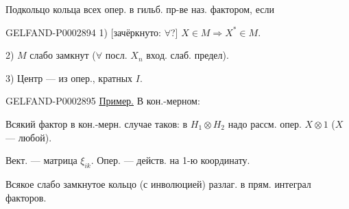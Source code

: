 Подкольцо кольца всех опер. в гильб. пр-ве наз. фактором, если

\begin{GelfandAdjacentEvidence}{GELFAND-P000289}{4}
1) [зачёркнуто: $\forall$?] $X\in M\Longrightarrow X^*\in M$.

\end{GelfandAdjacentEvidence}


2) $M$ слабо замкнут ($\forall$ посл. $X_n$ вход. слаб. предел).

3) Центр --- из опер., кратных $I$.

\begin{GelfandAdjacentEvidence}{GELFAND-P000289}{5}
\underline{Пример.} В кон.-мерном:





\end{GelfandAdjacentEvidence}


Всякий фактор в кон.-мерн. случае таков: в $H_1\otimes H_2$ надо рассм. опер. $X\otimes1$ ($X$ --- любой).

Вект. --- матрица $\xi_{ik}$. Опер. --- действ. на 1-ю координату.

\begin{center}\end{center}

Всякое слабо замкнутое кольцо (с инволюцией) разлаг. в прям. интеграл факторов.

